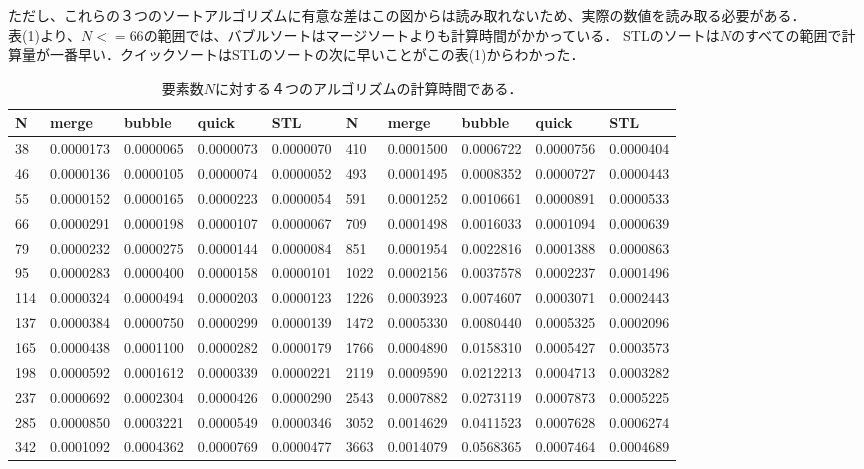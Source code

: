 \documentclass[fleqn, a4paper. 12pt]{ltjsarticle} %
\begin{document}
  ただし、これらの３つのソートアルゴリズムに有意な差はこの図からは読み取れないため、実際の数値を読み取る必要がある．\\
  表(1)より、$N<=66$の範囲では、バブルソートはマージソートよりも計算時間がかかっている．
  STLのソートは$N$のすべての範囲で計算量が一番早い．クイックソートはSTLのソートの次に早いことがこの表(1)からわかった．
  \begin{table}[tb]
    \caption{要素数$N$に対する４つのアルゴリズムの計算時間である．}
    \begin{tabular}{lllll|lllll}
    \hline
    N   & merge     & bubble    & quick     & STL       & N    & merge     & bubble    & quick     & STL       \\ \hline
    38  & 0.0000173 & 0.0000065 & 0.0000073 & 0.0000070 & 410  & 0.0001500 & 0.0006722 & 0.0000756 & 0.0000404 \\
    46  & 0.0000136 & 0.0000105 & 0.0000074 & 0.0000052 & 493  & 0.0001495 & 0.0008352 & 0.0000727 & 0.0000443 \\
    55  & 0.0000152 & 0.0000165 & 0.0000223 & 0.0000054 & 591  & 0.0001252 & 0.0010661 & 0.0000891 & 0.0000533 \\
    66  & 0.0000291 & 0.0000198 & 0.0000107 & 0.0000067 & 709  & 0.0001498 & 0.0016033 & 0.0001094 & 0.0000639 \\
    79  & 0.0000232 & 0.0000275 & 0.0000144 & 0.0000084 & 851  & 0.0001954 & 0.0022816 & 0.0001388 & 0.0000863 \\
    95  & 0.0000283 & 0.0000400 & 0.0000158 & 0.0000101 & 1022 & 0.0002156 & 0.0037578 & 0.0002237 & 0.0001496 \\
    114 & 0.0000324 & 0.0000494 & 0.0000203 & 0.0000123 & 1226 & 0.0003923 & 0.0074607 & 0.0003071 & 0.0002443 \\
    137 & 0.0000384 & 0.0000750 & 0.0000299 & 0.0000139 & 1472 & 0.0005330 & 0.0080440 & 0.0005325 & 0.0002096 \\
    165 & 0.0000438 & 0.0001100 & 0.0000282 & 0.0000179 & 1766 & 0.0004890 & 0.0158310 & 0.0005427 & 0.0003573 \\
    198 & 0.0000592 & 0.0001612 & 0.0000339 & 0.0000221 & 2119 & 0.0009590 & 0.0212213 & 0.0004713 & 0.0003282 \\
    237 & 0.0000692 & 0.0002304 & 0.0000426 & 0.0000290 & 2543 & 0.0007882 & 0.0273119 & 0.0007873 & 0.0005225 \\
    285 & 0.0000850 & 0.0003221 & 0.0000549 & 0.0000346 & 3052 & 0.0014629 & 0.0411523 & 0.0007628 & 0.0006274 \\
    342 & 0.0001092 & 0.0004362 & 0.0000769 & 0.0000477 & 3663 & 0.0014079 & 0.0568365 & 0.0007464 & 0.0004689 \\ \hline
    \end{tabular}
    \label{t1}
    \end{table}
\end{document}
